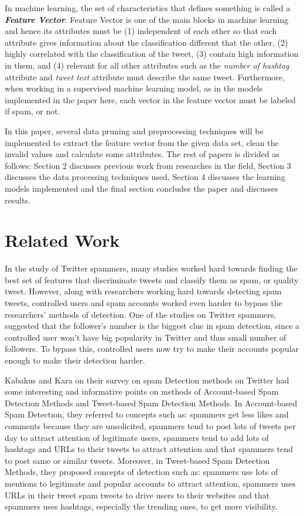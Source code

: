 \documentclass[conference]{IEEEtran}
\begin{document}
In machine learning, the set of characteristics that defines something is called a \textbf{\textit{Feature Vector}}. Feature Vector is one of the main blocks in machine learning and hence its attributes must be (1) independent of each other so that each attribute gives information about the classification different that the other, (2) highly correlated with the classification of the tweet, (3) contain high information in them, and (4) relevant for all other attributes such as the \textit{number of hashtag} attribute and \textit{tweet text} attribute must describe the same tweet. Furthermore, when working in a supervised machine learning model, as in the models implemented in the paper here, each vector in the feature vector must be labeled if spam, or not.

In this paper, several data pruning and preprocessing techniques will be implemented to extract the feature vector from the given data set, clean the invalid values and calculate some attributes. The rest of papers is divided as follows: Section 2 discusses previous work from researches in the field, Section 3 discusses the data processing techniques used, Section 4 discusses the learning models implemented and the final section concludes the paper and discusses results.

\section{Related Work}
In the study of Twitter spammers, many studies worked hard towards finding the best set of features that discriminate tweets and classify them as spam, or quality tweet. However, along with researchers working hard towards detecting spam tweets, controlled users and spam accounts worked even harder to bypass the researchers'  methods of detection. One of the studies on Twitter spammers, suggested that the follower's number is the biggest clue in spam detection, since a controlled user won't  have big popularity in Twitter and thus small number of followers\cite{b1}. To bypass this, controlled users now try to make their accounts popular enough to make their detection harder.

Kabakus and Kara on their survey on spam Detection methods on Twitter\cite{b2} had some interesting and informative points on methods of Account-based Spam Detectıon Methods and Tweet-based Spam Detection Methods. In Account-based Spam Detectıon, they referred to concepts such as: spammers get less likes and comments because they are unsolicited, spammers tend to post lots of tweets per day to attract attention of legitimate users, spammers tend to add lots of hashtags and URLs to their tweets to attract attention and that spammers tend to post same or similar tweets. Moreover, in Tweet-based Spam Detection Methods, they proposed concepts of detection such as: spammers use lots of mentions to legitimate and popular accounts to attract attention, spammers uses URLs in their tweet spam tweets to drive users to their websites and that spammers uses hashtags, especially the trending ones, to get more visibility.
\end{document}
